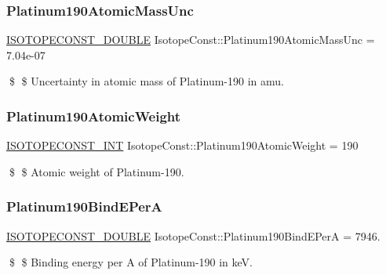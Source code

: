 \subsubsection{\texorpdfstring{Platinum190\+Atomic\+Mass\+Unc}{Platinum190AtomicMassUnc}}
{\footnotesize\ttfamily \mbox{\hyperlink{group___isotope_const-_macros_ga8f45a7272ce02c0b4c65c44636ed719a}{I\+S\+O\+T\+O\+P\+E\+C\+O\+N\+S\+T\+\_\+\+D\+O\+U\+B\+LE}} Isotope\+Const\+::\+Platinum190\+Atomic\+Mass\+Unc = 7.\+04e-\/07}

\$ \$ Uncertainty in atomic mass of Platinum-\/190 in amu. \mbox{\label{group___isotope_const-_platinum-_pt190_ga4b17f404012dc1eea67a50c0353109ee}} 
\subsubsection{\texorpdfstring{Platinum190\+Atomic\+Weight}{Platinum190AtomicWeight}}
{\footnotesize\ttfamily \mbox{\hyperlink{group___isotope_const-_macros_ga5f18360b3e99483a35c32d789e62621c}{I\+S\+O\+T\+O\+P\+E\+C\+O\+N\+S\+T\+\_\+\+I\+NT}} Isotope\+Const\+::\+Platinum190\+Atomic\+Weight = 190}

\$ \$ Atomic weight of Platinum-\/190. \mbox{\label{group___isotope_const-_platinum-_pt190_gad699bfbc33916fc8d2dde756153bb64e}} 
\subsubsection{\texorpdfstring{Platinum190\+Bind\+E\+PerA}{Platinum190BindEPerA}}
{\footnotesize\ttfamily \mbox{\hyperlink{group___isotope_const-_macros_ga8f45a7272ce02c0b4c65c44636ed719a}{I\+S\+O\+T\+O\+P\+E\+C\+O\+N\+S\+T\+\_\+\+D\+O\+U\+B\+LE}} Isotope\+Const\+::\+Platinum190\+Bind\+E\+PerA = 7946.}

\$ \$ Binding energy per A of Platinum-\/190 in keV. \mbox{\label{group___isotope_const-_platinum-_pt190_gad87e86fe5b3b5983e740a7e38af2d0ab}} 
